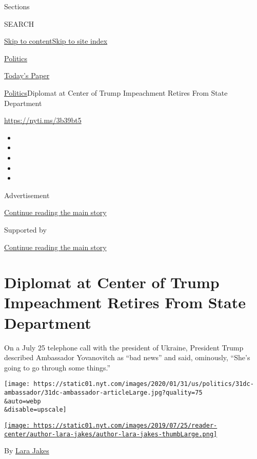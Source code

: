 Sections

SEARCH

\protect\hyperlink{site-content}{Skip to
content}\protect\hyperlink{site-index}{Skip to site index}

\href{https://www.nytimes.com/section/politics}{Politics}

\href{https://myaccount.nytimes.com/auth/login?response_type=cookie\&client_id=vi}{}

\href{https://www.nytimes.com/section/todayspaper}{Today's Paper}

\href{/section/politics}{Politics}\textbar{}Diplomat at Center of Trump
Impeachment Retires From State Department

\url{https://nyti.ms/3b39bt5}

\begin{itemize}
\item
\item
\item
\item
\item
\end{itemize}

Advertisement

\protect\hyperlink{after-top}{Continue reading the main story}

Supported by

\protect\hyperlink{after-sponsor}{Continue reading the main story}

\hypertarget{diplomat-at-center-of-trump-impeachment-retires-from-state-department}{%
\section{Diplomat at Center of Trump Impeachment Retires From State
Department}\label{diplomat-at-center-of-trump-impeachment-retires-from-state-department}}

On a July 25 telephone call with the president of Ukraine, President
Trump described Ambassador Yovanovitch as ``bad news'' and said,
ominously, ``She's going to go through some things.''

\texttt{[image: https://static01.nyt.com/images/2020/01/31/us/politics/31dc-ambassador/31dc-ambassador-articleLarge.jpg?quality=75\\\&auto=webp\\\&disable=upscale]}

\href{https://www.nytimes.com/by/lara-jakes}{\texttt{[image: https://static01.nyt.com/images/2019/07/25/reader-center/author-lara-jakes/author-lara-jakes-thumbLarge.png]}}

By \href{https://www.nytimes.com/by/lara-jakes}{Lara Jakes}

